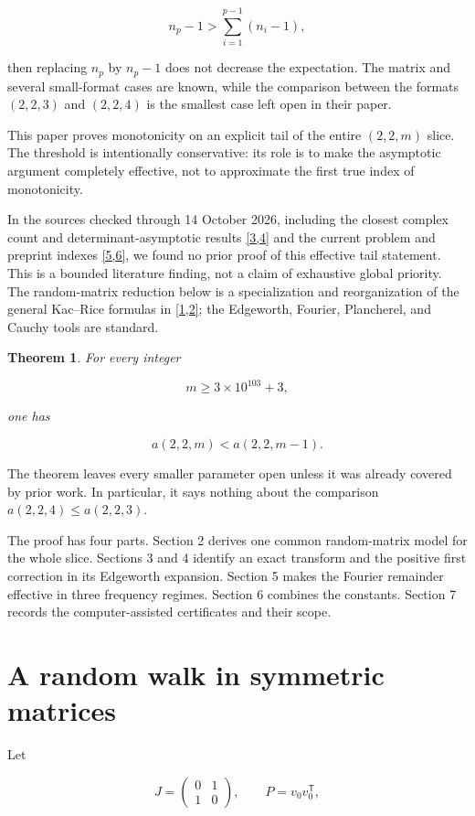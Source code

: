 \documentclass[11pt]{article}
\newtheorem{theorem}{Theorem}[section]
\begin{document}
\[
n_p-1>\sum_{i=1}^{p-1}(n_i-1),
\]

then replacing $n_p$ by $n_p-1$ does not decrease the expectation.  The matrix and several small-format cases are known, while the comparison between the formats $(2,2,3)$ and $(2,2,4)$ is the smallest case left open in their paper.

This paper proves monotonicity on an explicit tail of the entire $(2,2,m)$ slice.  The threshold is intentionally conservative: its role is to make the asymptotic argument completely effective, not to approximate the first true index of monotonicity.

In the sources checked through 14 October 2026, including the closest complex count and determinant-asymptotic results \hyperlink{ref3}{[3,4]} and the current problem and preprint indexes \hyperlink{ref5}{[5,6]}, we found no prior proof of this effective tail statement.  This is a bounded literature finding, not a claim of exhaustive global priority.  The random-matrix reduction below is a specialization and reorganization of the general Kac--Rice formulas in \hyperlink{ref1}{[1,2]}; the Edgeworth, Fourier, Plancherel, and Cauchy tools are standard.

\begin{theorem}
For every integer

\[
m\ge 3\times10^{103}+3,
\]

one has

\[
a(2,2,m)<a(2,2,m-1).
\]

\end{theorem}

The theorem leaves every smaller parameter open unless it was already covered by prior work.  In particular, it says nothing about the comparison $a(2,2,4)\le a(2,2,3)$.

The proof has four parts.  Section 2 derives one common random-matrix model for the whole slice.  Sections 3 and 4 identify an exact transform and the positive first correction in its Edgeworth expansion.  Section 5 makes the Fourier remainder effective in three frequency regimes.  Section 6 combines the constants.  Section 7 records the computer-assisted certificates and their scope.

\section{A random walk in symmetric matrices}

Let

\[
J=\begin{pmatrix}0&1\\1&0\end{pmatrix},
\qquad P=v_0v_0^{\mathsf T},
\]
\end{document}
